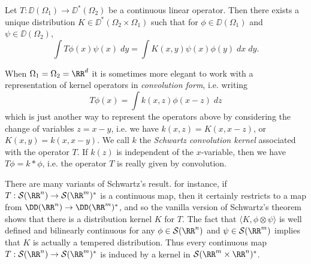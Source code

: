 \begin{theorem}
  Let $T: \DD(\Omega_1) \to \DD^*(\Omega_2)$ be a continuous linear operator. Then there exists a unique distribution $K \in \DD^*(\Omega_2 \times \Omega_1)$ such that for $\phi \in \DD(\Omega_1)$ and $\psi \in \DD(\Omega_2)$,
  \[ \int T\phi(x) \psi(x)\; dy = \int K(x,y) \psi(x) \phi(y)\; dx\; dy. \]
\end{theorem}

\begin{remark}
    When $\Omega_1 = \Omega_2 = \RR^d$ it is sometimes more elegant to work with a representation of kernel operators in \emph{convolution form}, i.e. writing
    \[ T \phi(x) = \int k(x,z) \phi(x-z)\; dz \]
    which is just another way to represent the operators above by considering the change of variables $z = x - y$, i.e. we have $k(x,z) = K(x,x-z)$, or $K(x,y) = k(x,x-y)$. We call $k$ the \emph{Schwartz convolution kernel} associated with the operator $T$. If $k(z)$ is independent of the $x$-variable, then we have $T \phi = k * \phi$, i.e. the operator $T$ is really given by convolution.
\end{remark}

\begin{remark}
    There are many variants of Schwartz's result. for instance, if $T: \mathcal{S}(\RR^n) \to \mathcal{S}(\RR^m)^*$ is a continuous map, then it certainly restricts to a map from $\DD(\RR^n) \to \DD(\RR^m)^*$, and so the vanilla version of Schwartz's theorem shows that there is a distribution kernel $K$ for $T$. The fact that $\langle K, \phi \otimes \psi \rangle$ is well defined and bilinearly continuous for any $\phi \in \mathcal{S}(\RR^n)$ and $\psi \in \mathcal{S}(\RR^m)$ implies that $K$ is actually a tempered distribution. Thus every continuous map $T: \mathcal{S}(\RR^n) \to \mathcal{S}(\RR^m)^*$ is induced by a kernel in $\mathcal{S}(\RR^m \times \RR^n)^*$.
\end{remark}


